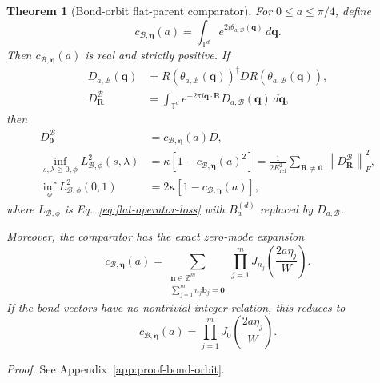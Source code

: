 \documentclass[11pt]{article}
\newcommand{\Z}{\mathbb Z}
\newcommand{\T}{\mathbb T}
\newcommand{\norm}[1]{\left\lVert #1\right\rVert}
\newtheorem{theorem}{Theorem}[section]
\begin{document}
\begin{theorem}[Bond-orbit flat-parent comparator]
\label{thm:bond-orbit}
For $0\le a\le\pi/4$, define
\begin{equation}
 c_{\mathcal B,\boldsymbol\eta}(a)
 =\int_{\T^d}e^{2i\theta_{a,\mathcal B}(\mathbf q)}\,d\mathbf q.
 \label{eq:bond-orbit-correlation}
\end{equation}
Then $c_{\mathcal B,\boldsymbol\eta}(a)$ is real and strictly positive. If
\begin{align}
 D_{a,\mathcal B}(\mathbf q)
 &=R(\theta_{a,\mathcal B}(\mathbf q))^\dagger
   D R(\theta_{a,\mathcal B}(\mathbf q)),\\
 D_{\mathbf R}^{\mathcal B}
 &=\int_{\T^d}e^{-2\pi i\mathbf q\cdot\mathbf R}
   D_{a,\mathcal B}(\mathbf q)\,d\mathbf q,
\end{align}
then
\begin{align}
 D_{\mathbf0}^{\mathcal B}
 &=c_{\mathcal B,\boldsymbol\eta}(a)D,\\
 \inf_{s,\lambda\ge0,\phi}L_{\mathcal B,\phi}^2(s,\lambda)
 &=\kappa[1-c_{\mathcal B,\boldsymbol\eta}(a)^2]
 =\frac{1}{2E_{\mathrm{ref}}^2}\sum_{\mathbf R\ne\mathbf0}
   \norm{D_{\mathbf R}^{\mathcal B}}_F^2,
 \label{eq:bond-orbit-tail}\\
 \inf_\phi L_{\mathcal B,\phi}^2(0,1)
 &=2\kappa[1-c_{\mathcal B,\boldsymbol\eta}(a)],
\end{align}
where $L_{\mathcal B,\phi}$ is Eq.~\eqref{eq:flat-operator-loss} with
$B_a^{(d)}$ replaced by $D_{a,\mathcal B}$.

Moreover, the comparator has the exact zero-mode expansion
\begin{equation}
 c_{\mathcal B,\boldsymbol\eta}(a)
 =\sum_{\substack{\mathbf n\in\Z^m\\
                   \sum_{j=1}^m n_j\mathbf b_j=\mathbf0}}
   \prod_{j=1}^m
   J_{n_j}\!\left(\frac{2a\eta_j}{W}\right).
 \label{eq:bond-orbit-bessel-sum}
\end{equation}
If the bond vectors have no nontrivial integer relation, this reduces to
\begin{equation}
 c_{\mathcal B,\boldsymbol\eta}(a)
 =\prod_{j=1}^mJ_0\!\left(\frac{2a\eta_j}{W}\right).
 \label{eq:independent-bond-product}
\end{equation}
\end{theorem}

\noindent\emph{Proof.} See Appendix~\ref{app:proof-bond-orbit}.
\end{document}
